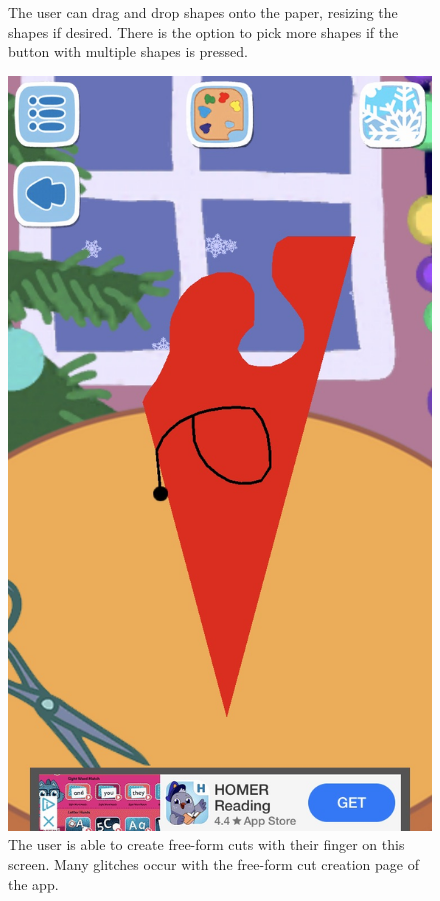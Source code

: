 \documentclass[11pt]{article}
\begin{document}
\begin{figure}[!ht]
\begin{minipage}{0.32\textwidth}
                            \caption{The user can drag and drop shapes onto the paper, resizing the shapes if desired. There is the option to pick more shapes if the button with multiple shapes is pressed.}
                            \label{fig:peppaShapes}
                        \end{minipage}
                        \begin{minipage}{0.32\textwidth}
                            \centering
                            \includegraphics[width=0.8\linewidth]{Images/peppa/peppaFreeFormCut}
                             \caption{The user is able to create free-form cuts with their finger on this screen. Many glitches occur with the free-form cut creation page of the app.}
                            \label{fig:peppaFreeFormCut}
                        \end{minipage}

\end{figure}
\end{document}
